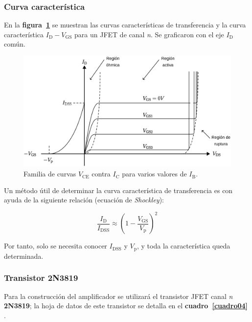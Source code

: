 \subsubsection{Curva característica}
En la \textbf{figura~\ref{figura08}} se muestran las curvas características de
transferencia y la curva característica $I_{\text{D}}-V_{\text{GS}}$ para un
JFET de canal \emph{n}. Se graficaron con el eje $I_{\text{D}}$ común.

\begin{figure}[!ht]
\centering
\includegraphics[scale=0.43]{diagramas/figura08.eps}
\caption{Familia de curvas $V_{\text{CE}}$ contra $I_{\text{C}}$ para varios
valores de $I_{\text{B}}$.}
\label{figura08}
\end{figure}

Un método útil de determinar la curva característica de transferencia es con
ayuda de la siguiente relación (ecuación de \emph{Shockley}):

\begin{equation*}
    \frac{I_{\text{D}}}{I_{\text{DSS}}} \approx
    \left(1 - \frac{V_{\text{GS}}}{V_{\text{p}}}\right)^2
\end{equation*}

Por tanto, solo se necesita conocer $I_{\text{DSS}}$ y $V_{\text{p}}$, y toda la
característica queda determinada.

\subsubsection{Transistor 2N3819}
Para la construcción del amplificador se utilizará el transistor JFET canal
\emph{n} \textbf{2N3819}; la hoja de datos de este transistor se detalla en
el \textbf{cuadro~\ref{cuadro04}} \cite{2N3819}.

